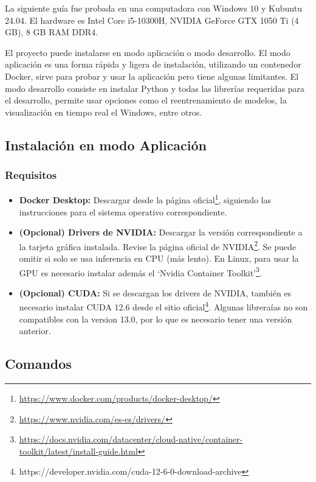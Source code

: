 \documentclass[11pt,a4paper]{article}
\begin{document}
La siguiente guía fue probada en una computadora con Windows 10 y Kubuntu 24.04. El hardware es Intel Core i5-10300H, NVIDIA GeForce GTX 1050 Ti (4 GB), 8 GB RAM DDR4.

El proyecto puede instalarse en modo aplicación o modo desarrollo. El modo aplicación es una forma rápida y ligera de instalación, utilizando un contenedor Docker, sirve para probar y usar la aplicación pero tiene algunas limitantes. El modo desarrollo consiste en instalar Python y todas las librerías requeridas para el desarrollo, permite usar opciones como el reentrenamiento de modelos, la visualización en tiempo real el Windows, entre otros.

\subsection{Instalación en modo Aplicación}

\subsubsection{Requisitos}

\begin{itemize}
    \item \textbf{Docker Desktop:} Descargar desde la página oficial\footnote{\url{https://www.docker.com/products/docker-desktop/}}, siguiendo las instrucciones para el sistema operativo correspondiente.
    \item \textbf{(Opcional) Drivers de NVIDIA:} Descargar la versión correspondiente a la tarjeta gráfica instalada. Revise la página oficial de NVIDIA\footnote{\url{https://www.nvidia.com/es-es/drivers/}}. Se puede omitir si solo se usa inferencia en CPU (más lento). En Linux, para usar la GPU es necesario instalar además el `Nvidia Container Toolkit'\footnote{\url{https://docs.nvidia.com/datacenter/cloud-native/container-toolkit/latest/install-guide.html}}.
    \item \textbf{(Opcional) CUDA:} Si se descargan los drivers de NVIDIA, también es necesario instalar CUDA 12.6 desde el sitio oficial\footnote{https://developer.nvidia.com/cuda-12-6-0-download-archive}. Algunas libreraías no son compatibles con la version 13.0, por lo que es necesario tener una versión anterior.
\end{itemize}

\subsection{Comandos}
\end{document}
